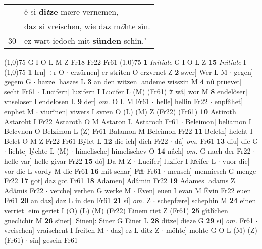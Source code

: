\documentclass[8pt,a4paper,notitlepage]{article}
\begin{document}
\begin{table}[ht]
\begin{minipage}[t]{0.5\linewidth}
\begin{tabular}{rl}
 & ê si \textbf{di\textit{t}ze} mære vernemen,\\ 
 & daz si vreischen, wie daz m\textit{ö}hte sîn.\\ 
30 & ez wart iedoch mit \textbf{sünden} schîn."\\ 
\end{tabular}
\scriptsize
\line(1,0){75} \newline
G I O L M Z Fr18 Fr22 Fr61 \newline
\line(1,0){75} \newline
\textbf{1} \textit{Initiale} G I O L Z  \textbf{15} \textit{Initiale} I  \newline
\line(1,0){75} \newline
\textbf{1} Irn] ÷r O  $\cdot$ erzürnen] er striten O erzvrnet Z \textbf{2} swer] Wer L M  $\cdot$ gegen] gegem G  $\cdot$ hazze] haszes L \textbf{3} an den witzen] andeme wisszin M \textbf{4} nû prüevet] secht Fr61  $\cdot$ Lucifern] luzifern I Lucifer L (M) (Fr61) \textbf{7} wâ] wor M \textbf{8} endelôser] vnseloser I endelosen L \textbf{9} der] \textit{om.} O L M Fr61  $\cdot$ helle] hellin Fr22  $\cdot$ enpfâhet] enphet M  $\cdot$ viurînen] viwers I svren O (L) (M) Z (Fr22) (Fr61) \textbf{10} Astiroth] Astaroht I Fr22 Astaroth O M Astaron L Astaroch Fr61  $\cdot$ Beleimon] beliamon I Belcvnon O Belzimon L (Z) Fr61 Balamon M Belcimon Fr22 \textbf{11} Beleth] heleht I Belet O M Z Fr22 Fr61 Býlet L \textbf{12} die ich] dich Fr22  $\cdot$ dâ] \textit{om.} Fr61 \textbf{13} diu] die G  $\cdot$ liehte] lýchte L (M)  $\cdot$ himelische] himelischev O \textbf{14} nâch] \textit{om.} G nach der Fr22  $\cdot$ helle var] helle givar Fr22 \textbf{15} dô] Da M Z  $\cdot$ Lucifer] luzifer I luͯcifer L  $\cdot$ vuor die] vor die L vordy M die Fr61 \textbf{16} mit schar] Fuͤr Fr61  $\cdot$ mensch] menniesch G menge Fr22 \textbf{17} got] daz got Fr61 \textbf{18} Adamen] Adâmin Fr22 \textbf{19} Adames] adams Z Adâmis Fr22  $\cdot$ verche] verhen G werke M  $\cdot$ Even] euen I evan M Êvin Fr22 euen Fr61 \textbf{20} an daz] daz L in den Fr61 \textbf{21} si] \textit{om.} Z  $\cdot$ schepfære] schephin M \textbf{24} einen verriet] eim geriet I (O) (L) (M) (Fr22) Einem riet Z (Fr61) \textbf{25} gîtlîchen] gneclichir M \textbf{26} sîner] [Sinen]: Siner G Einer L \textbf{28} ditze] dieze G \textbf{29} si] \textit{om.} Fr61  $\cdot$ vreischen] vraischent I freiten M  $\cdot$ daz] ez L ditz Z  $\cdot$ möhte] mohte G O L (M) (Z) (Fr61)  $\cdot$ sîn] gesein Fr61 \newline
\end{minipage}
\hspace{0.5cm}

\end{table}
\end{document}

